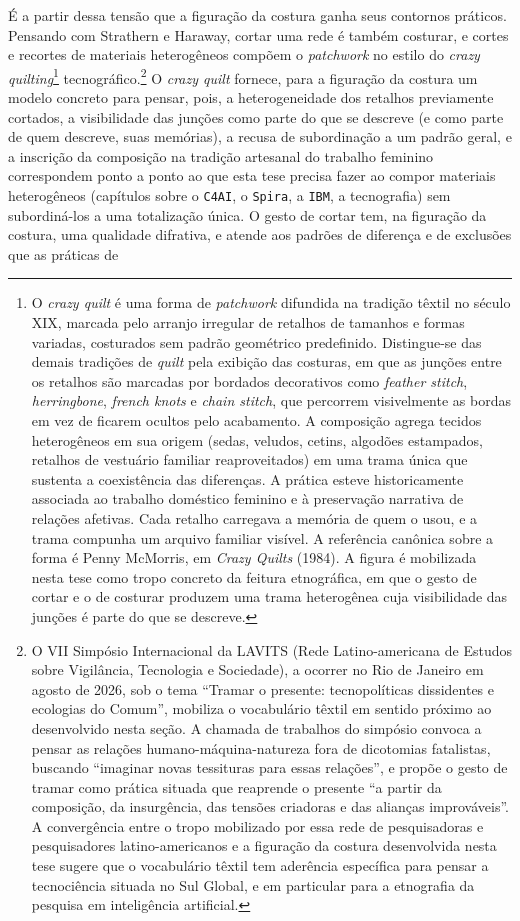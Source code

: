É a partir dessa tensão que a figuração da costura ganha seus contornos práticos. Pensando com Strathern e Haraway, cortar uma rede é também costurar, e cortes e recortes de materiais heterogêneos compõem o \textit{patchwork} no estilo do \textit{crazy quilting}\footnote{O \textit{crazy quilt} é uma forma de \textit{patchwork} difundida na tradição têxtil no século XIX, marcada pelo arranjo irregular de retalhos de tamanhos e formas variadas, costurados sem padrão geométrico predefinido. Distingue-se das demais tradições de \textit{quilt} pela exibição das costuras, em que as junções entre os retalhos são marcadas por bordados decorativos como \textit{feather stitch}, \textit{herringbone}, \textit{french knots} e \textit{chain stitch}, que percorrem visivelmente as bordas em vez de ficarem ocultos pelo acabamento. A composição agrega tecidos heterogêneos em sua origem (sedas, veludos, cetins, algodões estampados, retalhos de vestuário familiar reaproveitados) em uma trama única que sustenta a coexistência das diferenças. A prática esteve historicamente associada ao trabalho doméstico feminino e à preservação narrativa de relações afetivas. Cada retalho carregava a memória de quem o usou, e a trama compunha um arquivo familiar visível. A referência canônica sobre a forma é Penny McMorris, em \textit{Crazy Quilts} (1984). A figura é mobilizada nesta tese como tropo concreto da feitura etnográfica, em que o gesto de cortar e o de costurar produzem uma trama heterogênea cuja visibilidade das junções é parte do que se descreve.} tecnográfico.\footnote{O VII Simpósio Internacional da LAVITS (Rede Latino-americana de Estudos sobre Vigilância, Tecnologia e Sociedade), a ocorrer no Rio de Janeiro em agosto de 2026, sob o tema \enquote{Tramar o presente: tecnopolíticas dissidentes e ecologias do Comum}, mobiliza o vocabulário têxtil em sentido próximo ao desenvolvido nesta seção. A chamada de trabalhos do simpósio convoca a pensar as relações humano-máquina-natureza fora de dicotomias fatalistas, buscando \enquote{imaginar novas tessituras para essas relações}, e propõe o gesto de tramar como prática situada que reaprende o presente \enquote{a partir da composição, da insurgência, das tensões criadoras e das alianças improváveis}. A convergência entre o tropo mobilizado por essa rede de pesquisadoras e pesquisadores latino-americanos e a figuração da costura desenvolvida nesta tese sugere que o vocabulário têxtil tem aderência específica para pensar a tecnociência situada no Sul Global, e em particular para a etnografia da pesquisa em inteligência artificial.} O \textit{crazy quilt} fornece, para a figuração da costura um modelo concreto para pensar, pois, a heterogeneidade dos retalhos previamente cortados, a visibilidade das junções como parte do que se descreve (e como parte de quem descreve, suas memórias), a recusa de subordinação a um padrão geral, e a inscrição da composição na tradição artesanal do trabalho feminino correspondem ponto a ponto ao que esta tese precisa fazer ao compor materiais heterogêneos (capítulos sobre o \texttt{C4AI}, o \texttt{Spira}, a \texttt{IBM}, a tecnografia) sem subordiná-los a uma totalização única. O gesto de cortar tem, na figuração da costura, uma qualidade difrativa, e atende aos padrões de diferença e de exclusões que as práticas de 